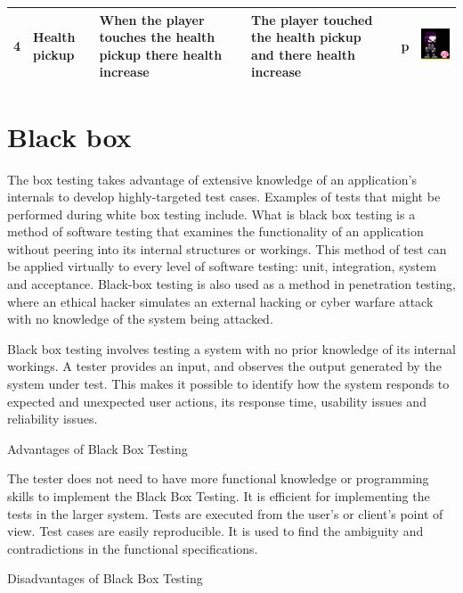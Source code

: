 \documentclass{article}
\begin{document}
\begin{center}
\begin{tabular}{|m{1em}|m{3em}|m{20em}|m{5em}|m{1.25em}|m{10em}|}
	\hline
		4 & Health pickup  & When the player touches the health pickup there health increase & The player touched the health pickup and there health increase & p & \includegraphics[scale=0.75]{health 1} \\
	\hline
\end{tabular}
\end{center}

\section{Black box}
The box testing takes advantage of extensive knowledge of an application’s internals to develop highly-targeted test cases. Examples of tests that might be performed during white box testing include. What is black box testing is a method of software testing that examines the functionality of an application without peering into its internal structures or workings. This method of test can be applied virtually to every level of software testing: unit, integration, system and acceptance. Black-box testing is also used as a method in penetration testing, where an ethical hacker simulates an external hacking or cyber warfare attack with no knowledge of the system being attacked. 

Black box testing involves testing a system with no prior knowledge of its internal workings. A tester provides an input, and observes the output generated by the system under test. This makes it possible to identify how the system responds to expected and unexpected user actions, its response time, usability issues and reliability issues.

Advantages of Black Box Testing

The tester does not need to have more functional knowledge or programming skills to implement the Black Box Testing.
It is efficient for implementing the tests in the larger system.
Tests are executed from the user’s or client’s point of view.
Test cases are easily reproducible.
It is used to find the ambiguity and contradictions in the functional specifications.

Disadvantages of Black Box Testing
\end{document}
